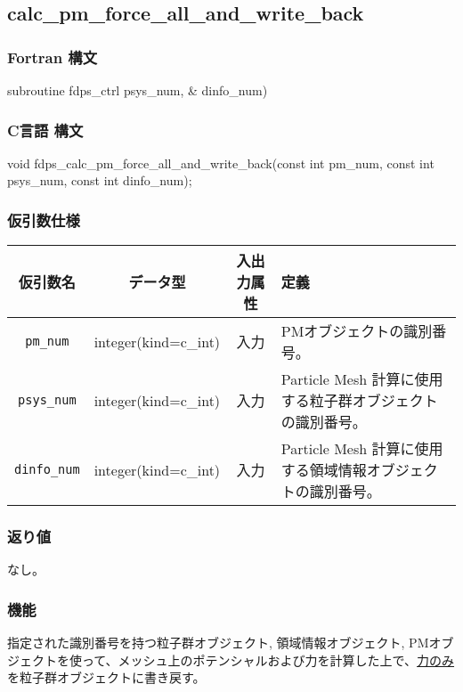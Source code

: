 \subsection{calc\_pm\_force\_all\_and\_write\_back}
\subsubsection*{Fortran 構文}
\begin{screen}
\begin{spverbatim}
subroutine fdps_ctrl%
                                                      psys_num, &
                                                      dinfo_num)
\end{spverbatim}
\end{screen}

\subsubsection*{C言語 構文}
\begin{screen}
\begin{spverbatim}
void fdps_calc_pm_force_all_and_write_back(const int pm_num,
                                           const int psys_num,
                                           const int dinfo_num);
\end{spverbatim}
\end{screen}

\subsubsection*{仮引数仕様}
\begin{table}[h]
\begin{tabularx}{\linewidth}{cccX}
\toprule
\rowcolor{Snow2}
仮引数名 & データ型 & 入出力属性 & 定義 \\
\midrule
\texttt{pm\_num} & integer(kind=c\_int) & 入力 & PMオブジェクトの識別番号。\\
\texttt{psys\_num} & integer(kind=c\_int) & 入力 & Particle Mesh 計算に使用する粒子群オブジェクトの識別番号。\\
\texttt{dinfo\_num} & integer(kind=c\_int) & 入力 & Particle Mesh 計算に使用する領域情報オブジェクトの識別番号。\\
\bottomrule
\end{tabularx}
\end{table}


\subsubsection*{返り値}
なし。

\subsubsection*{機能}
指定された識別番号を持つ粒子群オブジェクト, 領域情報オブジェクト, PMオブジェクトを使って、メッシュ上のポテンシャルおよび力を計算した上で、\uline{力のみ}を粒子群オブジェクトに書き戻す。
\clearpage

